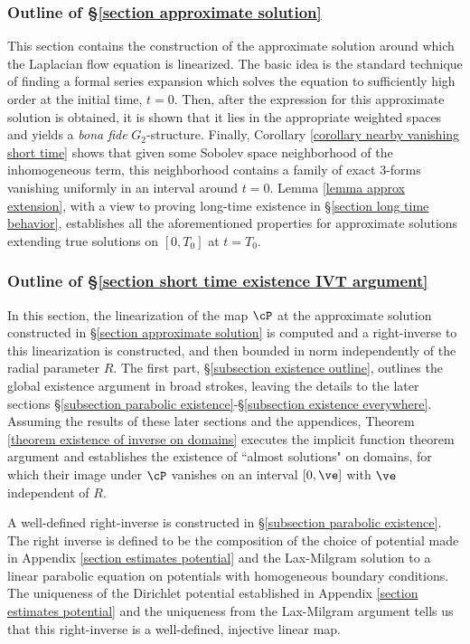 \documentclass[hidelinks, 12pt, oneside, reqno]{amsart}
\begin{document}
\subsubsection{Outline of \S \ref{section approximate solution}}

This section contains the construction of the approximate solution around which the Laplacian flow equation is linearized. The basic idea is the standard technique of finding a formal series expansion which solves the equation to sufficiently high order at the initial time, $t = 0$. Then, after the expression for this approximate solution is obtained, it is shown that it lies in the appropriate weighted spaces and yields a \textit{bona fide} $G_2$-structure. Finally, Corollary \ref{corollary nearby vanishing short time} shows that given some Sobolev space neighborhood of the inhomogeneous term, this neighborhood contains a family of exact $3$-forms vanishing uniformly in an interval around $t=0$. Lemma \ref{lemma approx extension}, with a view to proving long-time existence in \S \ref{section long time behavior}, establishes all the aforementioned properties for approximate solutions extending true solutions on $[0,T_0]$ at $t = T_0$. 

\subsubsection{Outline of \S \ref{section short time existence IVT argument}}

In this section, the linearization of the map $\cP$ at the approximate solution constructed in \S \ref{section approximate solution} is computed and a right-inverse to this linearization is constructed, and then bounded in norm independently of the radial parameter $R$. The first part, \S \ref{subsection existence outline}, outlines the global existence argument in broad strokes, leaving the details to the later sections \S \ref{subsection parabolic existence}-\S \ref{subsection existence everywhere}. Assuming the results of these later sections and the appendices, Theorem \ref{theorem existence of inverse on domains} executes the implicit function theorem argument and establishes the existence of ``almost solutions" on domains, for which their image under $\cP$ vanishes on an interval $[0,\ve]$ with $\ve$ independent of $R$. 

A well-defined right-inverse is constructed in \S \ref{subsection parabolic existence}. The right inverse is defined to be the composition of the choice of potential made in Appendix \ref{section estimates potential} and the Lax-Milgram solution to a linear parabolic equation on potentials with homogeneous boundary conditions. The uniqueness of the Dirichlet potential established in Appendix \ref{section estimates potential} and the uniqueness from the Lax-Milgram argument tells us that this right-inverse is a well-defined, injective linear map.  
\end{document}
